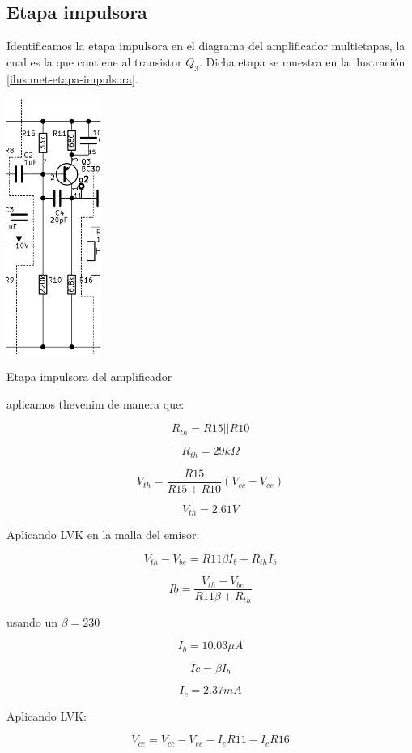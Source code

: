 \subsection{Etapa impulsora}

Identificamos la etapa impulsora en el diagrama del amplificador multietapas, la cual es la que contiene al  transistor $Q_3$. Dicha etapa se muestra en la ilustración \ref{ilus:met-etapa-impulsora}.

\begin{ilustracion}[ht]
    \centering
    \includegraphics[width=0.23\textwidth]{src/images/p3/etapa-impulsora.png}
    \caption{Etapa impulsora del amplificador}
    \label{ilus:met-etapa-impulsora}
\end{ilustracion}

aplicamos thevenim de manera que:

$$R_{th}= R15 || R10$$

$$R_{th}=29 k\Omega$$

$$V_{th} = \frac{R15}{R15 + R10} (V_{cc} - V_{ee})$$

$$V_{th} = 2.61 V $$

Aplicando LVK en la malla del emisor:

$$V_{th} - V_{be} = R11 \beta I_{b} + R_{th}I_b$$

$$ Ib = \frac{V_{th} - V_{be}}{R11\beta + R_{th}}$$

usando un $\beta = 230$

$$ I_b = 10.03 \mu A$$

$$Ic = \beta I_b$$

$$I_c = 2.37 mA$$

Aplicando LVK:

$$V_{ce} = V_{cc} - V_{ee} - I_eR11 - I_cR16$$

